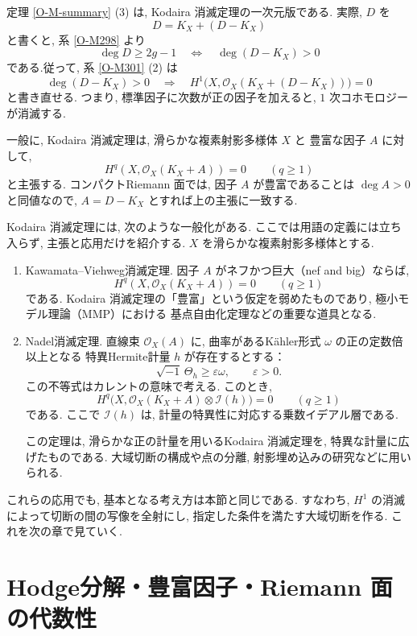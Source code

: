 \documentclass[dvipdfmx,a4paper,11pt]{article} %
\theoremstyle{definition}
\numberwithin{equation}{section}
\begin{document}
定理 \ref{O-M-summary} (3) は, Kodaira 消滅定理の一次元版である.
実際, $D$ を
\[
D=K_X+(D-K_X)
\]
と書くと, 系 \ref{O-M298} より
\[
\deg D\geq2g-1
\quad\Longleftrightarrow\quad
\deg(D-K_X)>0
\]
である.従って, 系 \ref{O-M301} (2) は
\[
\deg(D-K_X)>0
\quad\Longrightarrow\quad
H^1\bigl(X,\mathcal O_X(K_X+(D-K_X))\bigr)=0
\]
と書き直せる.
つまり, 標準因子に次数が正の因子を加えると, 
$1$ 次コホモロジーが消滅する.

一般に, Kodaira 消滅定理は, 滑らかな複素射影多様体 $X$ と
豊富な因子 $A$ に対して, 
\[
H^q(X,\mathcal O_X(K_X+A))=0
\qquad(q\geq1)
\]
と主張する.
コンパクトRiemann 面では, 因子 $A$ が豊富であることは
$\deg A>0$ と同値なので, 
$A=D-K_X$ とすれば上の主張に一致する.


Kodaira 消滅定理には, 次のような一般化がある.
ここでは用語の定義には立ち入らず, 主張と応用だけを紹介する.
$X$ を滑らかな複素射影多様体とする.

\begin{enumerate}
\item

Kawamata--Viehweg消滅定理.
因子 $A$ がネフかつ巨大（nef and big）ならば, 
\[
H^q(X,\mathcal O_X(K_X+A))=0
\qquad(q\geq1)
\]
である.
Kodaira 消滅定理の「豊富」という仮定を弱めたものであり, 
極小モデル理論（MMP）における
基点自由化定理などの重要な道具となる.

\item

Nadel消滅定理.
直線束 $\mathcal O_X(A)$ に, 
曲率があるKähler形式 $\omega$ の正の定数倍以上となる
特異Hermite計量 $h$ が存在するとする：
\[
\sqrt{-1}\,\Theta_h\geq\varepsilon\omega,
\qquad \varepsilon>0.
\]
この不等式はカレントの意味で考える.
このとき, 
\[
H^q\bigl(X,\mathcal O_X(K_X+A)\otimes\mathcal I(h)\bigr)=0
\qquad(q\geq1)
\]
である.
ここで $\mathcal I(h)$ は, 
計量の特異性に対応する乗数イデアル層である.

この定理は, 滑らかな正の計量を用いるKodaira 消滅定理を, 
特異な計量に広げたものである.
大域切断の構成や点の分離, 
射影埋め込みの研究などに用いられる.
\end{enumerate}

これらの応用でも, 基本となる考え方は本節と同じである.
すなわち, $H^1$ の消滅によって切断の間の写像を全射にし, 
指定した条件を満たす大域切断を作る.
これを次の章で見ていく. 





\newpage
\section{Hodge分解・豊富因子・Riemann 面の代数性}\label{O-S056}
\end{document}
